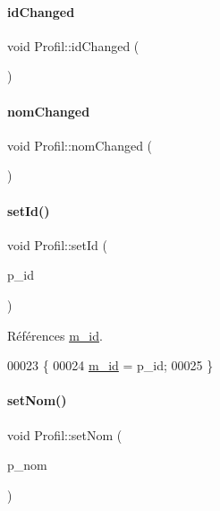 \paragraph{\texorpdfstring{id\+Changed}{idChanged}}
{\footnotesize\ttfamily void Profil\+::id\+Changed (\begin{DoxyParamCaption}{ }\end{DoxyParamCaption})\hspace{0.3cm}{\ttfamily [signal]}}

\mbox{\label{class_profil_aa55e5770c76e28ab12296e675cc939fe}} 
\paragraph{\texorpdfstring{nom\+Changed}{nomChanged}}
{\footnotesize\ttfamily void Profil\+::nom\+Changed (\begin{DoxyParamCaption}{ }\end{DoxyParamCaption})\hspace{0.3cm}{\ttfamily [signal]}}

\mbox{\label{class_profil_a1b8f1741f5a201f50f6f8d6cb274c5c0}} 
\paragraph{\texorpdfstring{set\+Id()}{setId()}}
{\footnotesize\ttfamily void Profil\+::set\+Id (\begin{DoxyParamCaption}\item[{Q\+String}]{p\+\_\+id }\end{DoxyParamCaption})}



Références \hyperlink{class_profil_a181301ab1db188efb1e7c1574f6be917}{m\+\_\+id}.


\begin{DoxyCode}
00023 \{
00024     \hyperlink{class_profil_a181301ab1db188efb1e7c1574f6be917}{m\_id} = p\_id;
00025 \}
\end{DoxyCode}
\mbox{\label{class_profil_a020bcb3d28350b10c58f86ab093719cd}} 
\paragraph{\texorpdfstring{set\+Nom()}{setNom()}}
{\footnotesize\ttfamily void Profil\+::set\+Nom (\begin{DoxyParamCaption}\item[{Q\+String}]{p\+\_\+nom }\end{DoxyParamCaption})}



